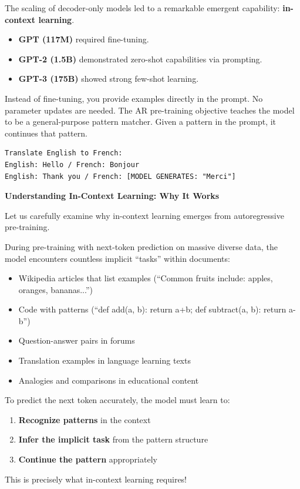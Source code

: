 \documentclass{article}
\begin{document}
The scaling of decoder-only models led to a remarkable emergent capability: \textbf{in-context learning}.

\begin{itemize}
   \item \textbf{GPT (117M)} required fine-tuning.
   \item \textbf{GPT-2 (1.5B)} demonstrated zero-shot capabilities via prompting.
   \item \textbf{GPT-3 (175B)} showed strong few-shot learning.
\end{itemize}

Instead of fine-tuning, you provide examples directly in the prompt. No parameter updates are needed. The AR pre-training objective teaches the model to be a general-purpose pattern matcher. Given a pattern in the prompt, it continues that pattern.

\begin{verbatim}
Translate English to French:
English: Hello / French: Bonjour
English: Thank you / French: [MODEL GENERATES: "Merci"]
\end{verbatim}

\textbf{Understanding In-Context Learning: Why It Works}

Let us carefully examine why in-context learning emerges from autoregressive pre-training.

\begin{tcolorbox}[colback=green!5!white, colframe=green!50!black, title=The Mechanism Behind In-Context Learning]
During pre-training with next-token prediction on massive diverse data, the model encounters countless implicit ``tasks'' within documents:

\begin{itemize}
\item Wikipedia articles that list examples (``Common fruits include: apples, oranges, bananas...'')
\item Code with patterns (``def add(a, b): return a+b; def subtract(a, b): return a-b'')
\item Question-answer pairs in forums
\item Translation examples in language learning texts
\item Analogies and comparisons in educational content
\end{itemize}

To predict the next token accurately, the model must learn to:
\begin{enumerate}
\item \textbf{Recognize patterns} in the context
\item \textbf{Infer the implicit task} from the pattern structure
\item \textbf{Continue the pattern} appropriately
\end{enumerate}

This is precisely what in-context learning requires!
\end{tcolorbox}
\end{document}

